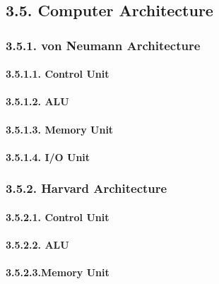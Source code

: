 \documentclass[
]{article}
\begin{document}
\hypertarget{computer-architecture}{%
\subsection{3.5. Computer Architecture}\label{computer-architecture}}

\hypertarget{von-neumann-architecture}{%
\subsubsection{3.5.1. von Neumann
Architecture}\label{von-neumann-architecture}}

\hypertarget{control-unit}{%
\paragraph{3.5.1.1. Control Unit}\label{control-unit}}

\hypertarget{alu}{%
\paragraph{3.5.1.2. ALU}\label{alu}}

\hypertarget{memory-unit}{%
\paragraph{3.5.1.3. Memory Unit}\label{memory-unit}}

\hypertarget{io-unit}{%
\paragraph{3.5.1.4. I/O Unit}\label{io-unit}}

\hypertarget{harvard-architecture}{%
\subsubsection{3.5.2. Harvard Architecture}\label{harvard-architecture}}

\hypertarget{control-unit-1}{%
\paragraph{3.5.2.1. Control Unit}\label{control-unit-1}}

\hypertarget{alu-1}{%
\paragraph{3.5.2.2. ALU}\label{alu-1}}

\hypertarget{memory-unit-1}{%
\paragraph{3.5.2.3.Memory Unit}\label{memory-unit-1}}
\end{document}
